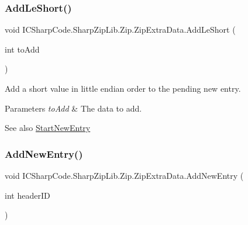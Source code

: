 \subsubsection{\texorpdfstring{Add\+Le\+Short()}{AddLeShort()}\hspace{0.1cm}{\footnotesize\ttfamily [2/2]}}
{\footnotesize\ttfamily void I\+C\+Sharp\+Code.\+Sharp\+Zip\+Lib.\+Zip.\+Zip\+Extra\+Data.\+Add\+Le\+Short (\begin{DoxyParamCaption}\item[{int}]{to\+Add }\end{DoxyParamCaption})\hspace{0.3cm}{\ttfamily [inline]}}



Add a short value in little endian order to the pending new entry. 


\begin{DoxyParams}{Parameters}
{\em to\+Add} & The data to add.\\
\hline
\end{DoxyParams}
\begin{DoxySeeAlso}{See also}
\hyperlink{class_i_c_sharp_code_1_1_sharp_zip_lib_1_1_zip_1_1_zip_extra_data_a3fd5ac216b1b6a0fe5ae92ea8156f20a}{Start\+New\+Entry}


\end{DoxySeeAlso}
\mbox{\label{class_i_c_sharp_code_1_1_sharp_zip_lib_1_1_zip_1_1_zip_extra_data_aba673aeb5ed08038a5c76377c0607ca9}} 
\subsubsection{\texorpdfstring{Add\+New\+Entry()}{AddNewEntry()}\hspace{0.1cm}{\footnotesize\ttfamily [1/2]}}
{\footnotesize\ttfamily void I\+C\+Sharp\+Code.\+Sharp\+Zip\+Lib.\+Zip.\+Zip\+Extra\+Data.\+Add\+New\+Entry (\begin{DoxyParamCaption}\item[{int}]{header\+ID }\end{DoxyParamCaption})\hspace{0.3cm}{\ttfamily [inline]}}



